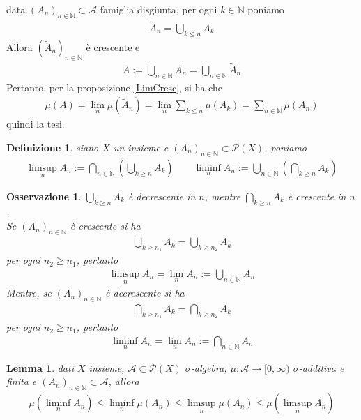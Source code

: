 \documentclass[oneside, 11pt]{amsbook}
\makeatletter
\newcommand{\0}{{(0)}}
\newcommand{\3}{{(3)}}
\theoremstyle{colonplain}
\newtheorem{lemma}[thm]{Lemma}
\theoremstyle{colondefinition}
\newtheorem{defn}[thm]{Definizione}
\theoremstyle{colonremark}
\newtheorem{rmk}[thm]{Osservazione}
\numberwithin{equation}{chapter}
\renewcommand{\proofname}{Dimostrazione}
\renewenvironment{proof}[1][\proofname]{\par
  \pushQED{\qed}%
  \normalfont \topsep6\p@\@plus6\p@\relax
  \trivlist
  \item[\hskip\labelsep\bfseries #1:]\ignorespaces
}{%
  \popQED\endtrivlist\@endpefalse
}
\makeatother
\begin{document}
\begin{proof}
data $(A_n)_{n \in \mathbb{N}} \subset \mathcal{A}$ famiglia disgiunta, per ogni $k \in \mathbb{N}$ poniamo
\begin{align}
    \widetilde{A}_n = \bigcup_{k \leq n} A_k
\end{align}
Allora $(\widetilde{A}_n)_{n \in \mathbb{N}}$ è crescente e 
\begin{align}
    A := \bigcup_{n \in \mathbb{N}} A_n = \bigcup_{n \in \mathbb{N}} \widetilde{A}_n
\end{align}
Pertanto, per la proposizione \ref{LimCresc}, si ha che
\begin{align}
    \mu(A) = \lim_n \mu(\widetilde{A}_n) = \lim_n \sum_{k \leq n} \mu(A_k) = \sum_{n \in \mathbb{N}} \mu(A_n)
\end{align}
quindi la tesi.
\end{proof}
\begin{defn} siano $X$ un insieme e $(A_n)_{n \in \mathbb{N}} \subset \mathcal{P}(X)$, poniamo
\begin{align}
    \limsup_n A_n := \bigcap_{n \in \mathbb{N}}\left(\bigcup_{k \geq n} A_k\right) \qquad \liminf_n A_n := \bigcup_{n \in \mathbb{N}}\left(\bigcap_{k \geq n} A_k\right) 
\end{align}
\end{defn}
\begin{rmk}
$\bigcup_{k \geq n} A_k$ è decrescente in $n$, mentre $\bigcap_{k \geq n} A_k$ è crescente in $n$. \\
Se $(A_n)_{n \in \mathbb{N}}$ è crescente si ha
\begin{align}
    \bigcup_{k \geq n_1} A_k = \bigcup_{k \geq n_2} A_k
\end{align}
per ogni $n_2 \geq n_1$, pertanto
\begin{align}
    \limsup_n A_n = \lim_n A_n := \bigcup_{n \in \mathbb{N}} A_n
\end{align}
Mentre, se $(A_n)_{n \in \mathbb{N}}$ è decrescente si ha
\begin{align}
    \bigcap_{k \geq n_1} A_k = \bigcap_{k \geq n_2} A_k
\end{align}
per ogni $n_2 \geq n_1$, pertanto
\begin{align}
    \liminf_n A_n = \lim_n A_n := \bigcap_{n \in \mathbb{N}} A_n
\end{align}
\end{rmk}
\begin{lemma}
dati $X$ insieme, $\mathcal{A} \subset \mathcal{P}(X)$ $\sigma$-algebra, $\mu : \mathcal{A} \longrightarrow [0, \infty)$ $\sigma$-additiva e finita e $(A_n)_{n \in \mathbb{N}} \subset \mathcal{A}$, allora
\begin{align}
    \mu(\liminf_n A_n) \leq \liminf_n \mu(A_n) \leq \limsup_n \mu(A_n) \leq \mu(\limsup_n A_n)
\end{align}
\end{lemma}
\end{document}
